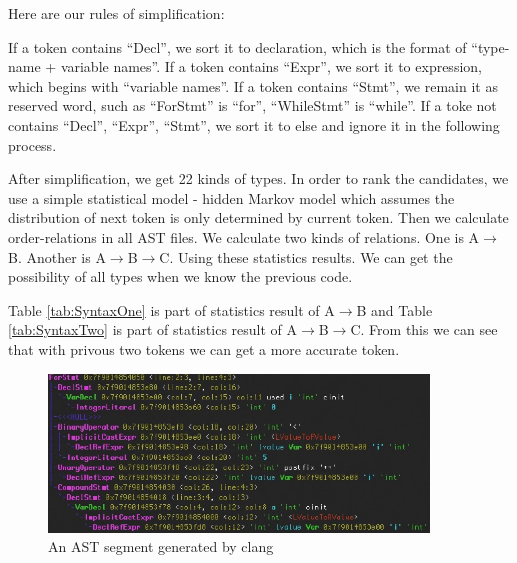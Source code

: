 \documentclass[prodmode,acmtecs]{acmsmall} %
\begin{document}
Here are our rules of simplification:

If a token contains “Decl”, we sort it to declaration, which is the format of “type-name + variable names”. If a token contains “Expr”, we sort it to expression, which begins with “variable names”. If a token contains “Stmt”, we remain it as reserved word, such as “ForStmt” is “for”, “WhileStmt” is “while”. If a toke not contains “Decl”, “Expr”, “Stmt”, we sort it to else and ignore it in the following process.

After simplification, we get 22 kinds of types. In order to rank the candidates, we use a simple statistical model - hidden Markov model which assumes the distribution of next token is only determined by current token\cite{rabiner1986introduction}. Then we calculate order-relations in all AST files. We calculate two kinds of relations. One is A$\longrightarrow$B. Another is A$\longrightarrow$B$\longrightarrow$C. Using these statistics results. We can get the possibility of all types when we know the previous code. 

Table \ref{tab:SyntaxOne} is part of statistics result of A$\longrightarrow$B and Table \ref{tab:SyntaxTwo} is part of statistics result of A$\longrightarrow$B$\longrightarrow$C. From this we can see that with privous two tokens we can get a more accurate token.


\begin{figure}
\centerline{\includegraphics[width=0.9\textwidth]{ast_example.jpg}}
\caption{An AST segment generated by clang}
\label{fig:ast example}
\end{figure}


\begin{table}%
\end{table}%
\end{document}
